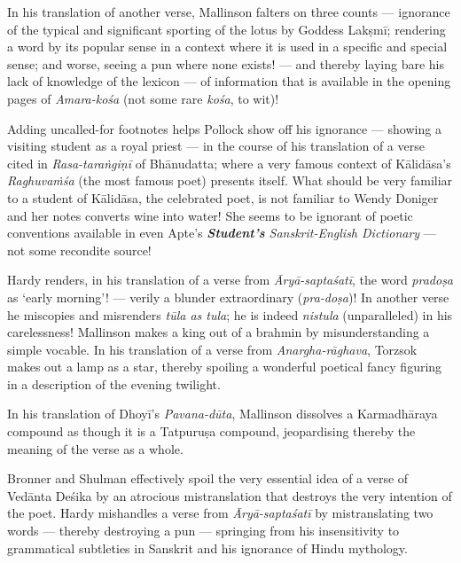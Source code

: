 In his translation of another verse, Mallinson falters on three counts --- ignorance of the typical and significant sporting of the lotus by Goddess Lakṣmī; rendering a word by its popular sense in a context where it is used in a specific and special sense; and worse, seeing a pun where none exists! --- and thereby laying bare his lack of knowledge of the lexicon --- of information that is available in the opening pages of \textsl{Amara-kośa} (not some rare \textsl{kośa}, to wit)!

Adding uncalled-for footnotes helps Pollock show off his ignorance --- showing a visiting student as a royal priest --- in the course of his translation of a verse cited in \textsl{Rasa-taraṅgiṇī} of Bhānudatta; where a very famous context of Kālidāsa’s \textsl{Raghuvaṁśa} (the most famous poet) presents itself. What should be very familiar to a student of Kālidāsa, the celebrated poet, is not familiar to Wendy Doniger and her notes converts wine into water! She seems to be ignorant of poetic conventions available in even Apte’s \textsl{\textbf{Student’s} Sanskrit-English Dictionary} --- not some recondite source!

Hardy renders, in his translation of a verse from \textsl{Āryā-saptaśatī}, the word \textsl{pradoṣa} as ‘early morning’! --- verily a blunder extraordinary (\textsl{pra-doṣa})! In another verse he miscopies and misrenders \textsl{tūla as tula}; he is indeed \textsl{nistula} (unparalleled) in his carelessness! Mallinson makes a king out of a brahmin by misunderstanding a simple vocable. In his translation of a verse from \textsl{Anargha-rāghava}, Torzsok makes out a lamp as a star, thereby spoiling a wonderful poetical fancy figuring in a description of the evening twilight.

In his translation of Dhoyī’s \textsl{Pavana-dūta}, Mallinson dissolves a Karmadhāraya compound as though it is a Tatpuruṣa compound, jeopardising thereby the meaning of the verse as a whole.

Bronner and Shulman effectively spoil the very essential idea of a verse of Vedānta Deśika by an atrocious mistranslation that destroys the very intention of the poet. Hardy mishandles a verse from \textsl{Āryā-saptaśatī} by mistranslating two words --- thereby destroying a pun --- springing from his insensitivity to grammatical subtleties in Sanskrit and his ignorance of Hindu mythology.

